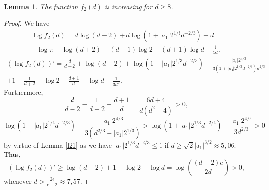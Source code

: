 \documentclass[a4paper,12pt]{article}
\numberwithin{equation}{section}
\newcommand{\<}{\langle}
\renewcommand{\>}{\rangle}
\theoremstyle{plain}
\newtheorem{lemma}[theorem]{\bf Lemma}
\theoremstyle{definition}
\theoremstyle{remark}
\renewcommand{\le}{\leqslant}
\renewcommand{\ge}{\geqslant}
\begin{document}
\begin{lemma}
\label{l22}
The function $f_2(d)$ is increasing for $d \ge 8$.
\end{lemma}

\begin{proof}
We have
\begin{eqnarray*}
\log f_2 (d) = d \log (d-2) + d \log \left(1 + |a_1|2^{1/3} d^{-2/3}\right) + d \\
- \log \pi - \log (d+2) - (d-1) \log 2 - (d+1) \log d - \frac1{3d},
\end{eqnarray*}
\begin{eqnarray*}
\left(\log f_2 (d)\right)' 
= \frac{d}{d-2} + \log (d-2) + \log \left(1 + |a_1|2^{1/3} d^{-2/3}\right)
- \frac{|a_1| 2^{4/3}}{3 \left(1 + |a_1|2^{1/3} d^{-2/3}\right) d^{2/3}} \\
+1 - \frac1{d+2} - \log 2 - \frac{d+1}d - \log d + \frac1{3d^2}.
\end{eqnarray*}
Furthermore,
$$
\frac{d}{d-2} - \frac1{d+2} - \frac{d+1}d = \frac{6d+4}{d(d^2-4)} > 0,
$$
$$
\log \left(1 + |a_1|2^{1/3} d^{-2/3}\right)
- \frac{|a_1| 2^{4/3}}{3 \left(d^{2/3} + |a_1|2^{1/3}\right)}
> \log \left(1 + |a_1|2^{1/3} d^{-2/3}\right)
- \frac{|a_1| 2^{4/3}}{3 d^{2/3}} > 0
$$ 
by virtue of Lemma \ref{l21} as we have $|a_1| 2^{1/3} d^{-2/3} \le 1$
if $d \ge \sqrt 2 |a_1|^{3/2} \approx 5,06$.
Thus,
$$
\left(\log f_2 (d)\right)' \ge
\log (d-2) + 1 - \log 2 - \log d = \log \left(\frac{(d-2) e}{2d}\right) > 0,
$$
whenever
$d > \frac{2e}{e-2} \approx 7,57$.
\end{proof}
\end{document}
